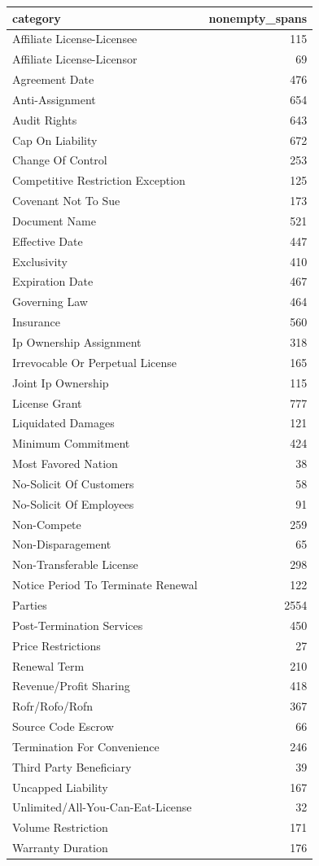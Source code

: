 \begin{tabular}{lr}
\toprule
category & nonempty\_spans \\
\midrule
Affiliate License-Licensee & 115 \\
Affiliate License-Licensor & 69 \\
Agreement Date & 476 \\
Anti-Assignment & 654 \\
Audit Rights & 643 \\
Cap On Liability & 672 \\
Change Of Control & 253 \\
Competitive Restriction Exception & 125 \\
Covenant Not To Sue & 173 \\
Document Name & 521 \\
Effective Date & 447 \\
Exclusivity & 410 \\
Expiration Date & 467 \\
Governing Law & 464 \\
Insurance & 560 \\
Ip Ownership Assignment & 318 \\
Irrevocable Or Perpetual License & 165 \\
Joint Ip Ownership & 115 \\
License Grant & 777 \\
Liquidated Damages & 121 \\
Minimum Commitment & 424 \\
Most Favored Nation & 38 \\
No-Solicit Of Customers & 58 \\
No-Solicit Of Employees & 91 \\
Non-Compete & 259 \\
Non-Disparagement & 65 \\
Non-Transferable License & 298 \\
Notice Period To Terminate Renewal & 122 \\
Parties & 2554 \\
Post-Termination Services & 450 \\
Price Restrictions & 27 \\
Renewal Term & 210 \\
Revenue/Profit Sharing & 418 \\
Rofr/Rofo/Rofn & 367 \\
Source Code Escrow & 66 \\
Termination For Convenience & 246 \\
Third Party Beneficiary & 39 \\
Uncapped Liability & 167 \\
Unlimited/All-You-Can-Eat-License & 32 \\
Volume Restriction & 171 \\
Warranty Duration & 176 \\
\bottomrule
\end{tabular}
